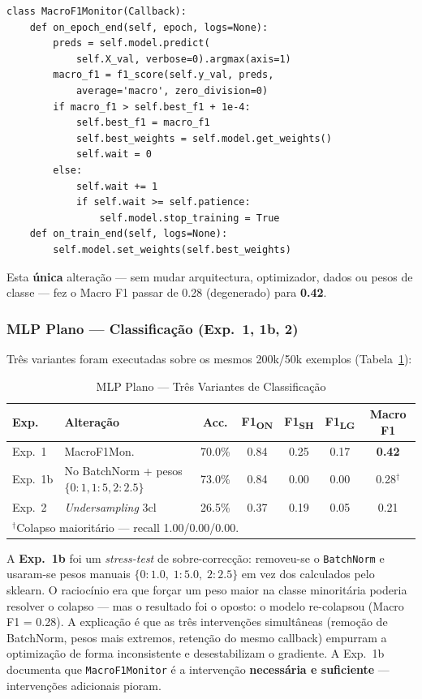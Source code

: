 \documentclass[conference]{IEEEtran}
\begin{document}
\begin{lstlisting}[caption=MacroF1Monitor (DeepLearning.py)]
class MacroF1Monitor(Callback):
    def on_epoch_end(self, epoch, logs=None):
        preds = self.model.predict(
            self.X_val, verbose=0).argmax(axis=1)
        macro_f1 = f1_score(self.y_val, preds,
            average='macro', zero_division=0)
        if macro_f1 > self.best_f1 + 1e-4:
            self.best_f1 = macro_f1
            self.best_weights = self.model.get_weights()
            self.wait = 0
        else:
            self.wait += 1
            if self.wait >= self.patience:
                self.model.stop_training = True
    def on_train_end(self, logs=None):
        self.model.set_weights(self.best_weights)
\end{lstlisting}

Esta \textbf{única} alteração — sem mudar arquitectura, optimizador, dados ou
pesos de classe — fez o Macro F1 passar de 0.28 (degenerado) para \textbf{0.42}.

\subsubsection{MLP Plano — Classificação (Exp.~1, 1b, 2)}
Três variantes foram executadas sobre os mesmos 200k/50k exemplos
(Tabela~\ref{tab:mlp_flat}):

\begin{table}[h]
\centering
\caption{MLP Plano — Três Variantes de Classificação}
\label{tab:mlp_flat}
\setlength{\tabcolsep}{3pt}
\begin{tabular}{p{2.4cm}p{2.2cm}ccccc}
\toprule
\textbf{Exp.} & \textbf{Alteração} & \textbf{Acc.} & \textbf{F1\textsubscript{ON}} & \textbf{F1\textsubscript{SH}} & \textbf{F1\textsubscript{LG}} & \textbf{Macro F1} \\
\midrule
Exp.~1 & MacroF1Mon. & 70.0\% & 0.84 & 0.25 & 0.17 & \textbf{0.42} \\
Exp.~1b & No BatchNorm + pesos $\{0:1,1:5,2:2.5\}$ & 73.0\% & 0.84 & 0.00 & 0.00 & 0.28$^\dagger$ \\
Exp.~2 & \textit{Undersampling} 3cl & 26.5\% & 0.37 & 0.19 & 0.05 & 0.21 \\
\bottomrule
\multicolumn{7}{l}{$^\dagger$Colapso maioritário — recall 1.00/0.00/0.00.} \\
\end{tabular}
\end{table}

A \textbf{Exp.~1b} foi um \textit{stress-test} de sobre-correcção: removeu-se
o \texttt{BatchNorm} e usaram-se pesos manuais $\{0:1.0,\;1:5.0,\;2:2.5\}$
em vez dos calculados pelo sklearn. O raciocínio era que forçar um peso maior
na classe minoritária poderia resolver o colapso — mas o resultado foi o
oposto: o modelo re-colapsou (Macro F1 = 0.28). A explicação é que as três
intervenções simultâneas (remoção de BatchNorm, pesos mais extremos, retenção
do mesmo callback) empurram a optimização de forma inconsistente e desestabilizam
o gradiente. A Exp.~1b documenta que \texttt{MacroF1Monitor} é a intervenção
\textbf{necessária e suficiente} — intervenções adicionais pioram.
\end{document}
